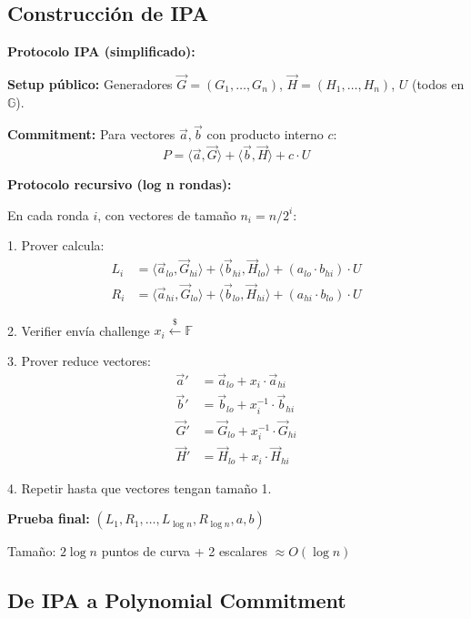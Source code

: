 \documentclass[11pt,a4paper,twoside]{book}
\begin{document}
\subsection{Construcci\'on de IPA}

\begin{mathnote}
\textbf{Protocolo IPA (simplificado):}

\textbf{Setup p\'ublico:} Generadores $\vec{G} = (G_1, \ldots, G_n)$, $\vec{H} = (H_1, \ldots, H_n)$, $U$ (todos en $\mathbb{G}$).

\textbf{Commitment:} Para vectores $\vec{a}, \vec{b}$ con producto interno $c$:
\[ P = \langle \vec{a}, \vec{G} \rangle + \langle \vec{b}, \vec{H} \rangle + c \cdot U \]

\textbf{Protocolo recursivo (log n rondas):}

En cada ronda $i$, con vectores de tama\~no $n_i = n/2^i$:

1. Prover calcula:
\begin{align*}
L_i &= \langle \vec{a}_{lo}, \vec{G}_{hi} \rangle + \langle \vec{b}_{hi}, \vec{H}_{lo} \rangle + (a_{lo} \cdot b_{hi}) \cdot U \\
R_i &= \langle \vec{a}_{hi}, \vec{G}_{lo} \rangle + \langle \vec{b}_{lo}, \vec{H}_{hi} \rangle + (a_{hi} \cdot b_{lo}) \cdot U
\end{align*}

2. Verifier env\'ia challenge $x_i \xleftarrow{\$} \mathbb{F}$

3. Prover reduce vectores:
\begin{align*}
\vec{a}' &= \vec{a}_{lo} + x_i \cdot \vec{a}_{hi} \\
\vec{b}' &= \vec{b}_{lo} + x_i^{-1} \cdot \vec{b}_{hi} \\
\vec{G}' &= \vec{G}_{lo} + x_i^{-1} \cdot \vec{G}_{hi} \\
\vec{H}' &= \vec{H}_{lo} + x_i \cdot \vec{H}_{hi}
\end{align*}

4. Repetir hasta que vectores tengan tama\~no 1.

\textbf{Prueba final:} $(L_1, R_1, \ldots, L_{\log n}, R_{\log n}, a, b)$

Tama\~no: $2 \log n$ puntos de curva + 2 escalares $\approx O(\log n)$
\end{mathnote}

\subsection{De IPA a Polynomial Commitment}
\end{document}

